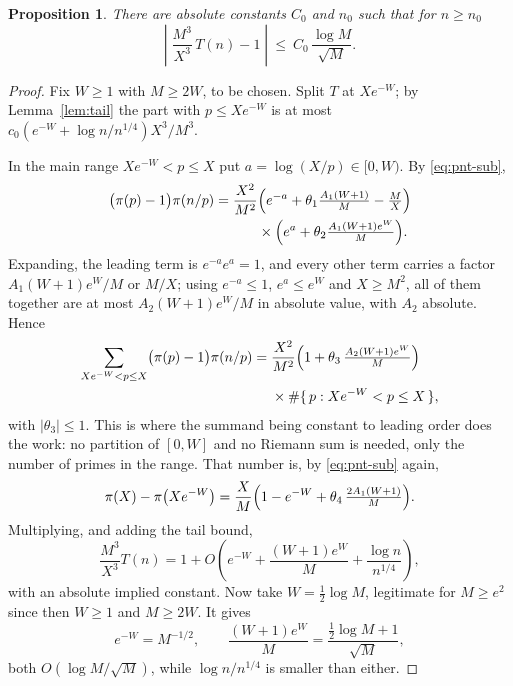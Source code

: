 \documentclass[a4paper,11pt,oneside,reqno]{amsart}
\theoremstyle{definition}
\theoremstyle{remark}
\theoremstyle{plain}
\newtheorem{proposition}[definition]{Proposition}
\begin{document}
\begin{proposition}\label{prop:T}
  There are absolute constants \(C_0\) and \(n_0\) such that for \(n \ge n_0\)
  \begin{equation}\label{eq:Tasymp}
    \left|\;\frac{M^{3}}{X^{3}}\,T(n)-1\;\right|
      \ \le \ C_0\,\frac{\log M}{\sqrt M} .
  \end{equation}
\end{proposition}

\begin{proof}
  Fix \(W \ge 1\) with \(M \ge 2W\), to be chosen. Split \(T\) at \(Xe^{-W}\); by
  Lemma~\ref{lem:tail} the part with \(p \le Xe^{-W}\) is at most
  \(c_0(e^{-W}+\log n/n^{1/4})X^{3}/M^{3}\).

  In the main range \(Xe^{-W} < p \le X\) put \(a = \log(X/p) \in [0,W)\). By
  \eqref{eq:pnt-sub},
  \begin{align*}
    \bigl(\pi(p)-1\bigr)\pi(n/p)
      =\frac{X^{2}}{M^{2}}
       &\Bigl(e^{-a}+\theta_1\tfrac{A_1(W+1)}{M}-\tfrac{M}{X}\Bigr)\\
       &\times
       \Bigl(e^{a}+\theta_2\tfrac{A_1(W+1)e^{W}}{M}\Bigr).
  \end{align*}
  Expanding, the leading term is \(e^{-a}e^{a} = 1\), and every other term
  carries a factor \(A_1(W+1)e^{W}/M\) or \(M/X\); using \(e^{-a} \le 1\),
  \(e^{a} \le e^{W}\) and \(X \ge M^{2}\), all of them together are at most
  \(A_2(W+1)e^{W}/M\) in absolute value, with \(A_2\) absolute. Hence
  \begin{align*}
    \sum_{Xe^{-W} < p \le X}\bigl(\pi(p)-1\bigr)\pi(n/p)
      ={}&\frac{X^{2}}{M^{2}}
          \Bigl(1+\theta_3\,\tfrac{A_2(W+1)e^{W}}{M}\Bigr)\\
        &\times \#\{\,p : Xe^{-W} < p \le X\,\},
  \end{align*}
  with \(|\theta_3|\le 1\). This is where the summand being constant to leading
  order does the work: no partition of \([0,W]\) and no Riemann sum is needed,
  only the number of primes in the range. That number is, by
  \eqref{eq:pnt-sub} again,
  \[
    \pi(X)-\pi\bigl(Xe^{-W}\bigr)
      =\frac{X}{M}\Bigl(1-e^{-W}+\theta_4\,\tfrac{2A_1(W+1)}{M}\Bigr).
  \]
  Multiplying, and adding the tail bound,
  \[
    \frac{M^{3}}{X^{3}}T(n)
      =1+O\!\left(e^{-W}+\frac{(W+1)e^{W}}{M}+\frac{\log n}{n^{1/4}}\right),
  \]
  with an absolute implied constant. Now take \(W = \tfrac{1}{2}\log M\), legitimate
  for \(M \ge e^{2}\) since then \(W \ge 1\) and \(M \ge 2W\). It gives
  \[
    e^{-W} = M^{-1/2},\qquad \frac{(W+1)e^{W}}{M} = \frac{\tfrac{1}{2}\log M+1}{\sqrt M},
  \]
  both \(O(\log M/\sqrt M)\), while \(\log n/n^{1/4}\) is smaller than either.
\end{proof}
\end{document}
